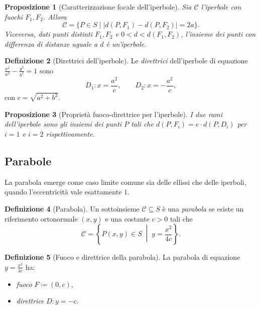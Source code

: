 \documentclass[11pt, a4paper]{book}
\theoremstyle{definition}
\newtheorem{definizione}{Definizione}[section]
\theoremstyle{plain}
\newtheorem{proposizione}[definizione]{Proposizione}
\theoremstyle{remark}
\begin{document}
\begin{proposizione}[Caratterizzazione focale dell'iperbole]
\label{prop:foc-iper}
Sia $\mathcal{C}$ l'iperbole con fuochi $F_1, F_2$. Allora
\[
  \mathcal{C} = \bigl\{ P \in S \;\big|\; |d(P,F_1) - d(P,F_2)| = 2a \bigr\}.
\]
Viceversa, dati punti distinti $F_1, F_2$ e $0 < d < d(F_1,F_2)$, l'insieme dei punti con differenza di distanze uguale a $d$ è un'iperbole.
\end{proposizione}

\begin{defbox}
\begin{definizione}[Direttrici dell'iperbole]
\label{def:direttrici-iper}
Le \emph{direttrici} dell'iperbole di equazione $\frac{x^2}{a^2}-\frac{y^2}{b^2}=1$ sono
\[
  D_1 \colon x = \frac{a^2}{c}, \qquad D_2 \colon x = -\frac{a^2}{c},
\]
con $c = \sqrt{a^2+b^2}$.
\end{definizione}
\end{defbox}

\begin{proposizione}[Proprietà fuoco-direttrice per l'iperbole]
\label{prop:foc-dir-iper}
I due rami dell'iperbole sono gli insiemi dei punti $P$ tali che $d(P, F_i) = e \cdot d(P, D_i)$ per $i=1$ e $i=2$ rispettivamente.
\end{proposizione}

\subsection{Parabole}

La parabola emerge come caso limite comune sia delle ellissi che delle iperboli, quando l'eccentricità vale esattamente $1$.

\begin{defbox}
\begin{definizione}[Parabola]
\label{def:parabola}
Un sottoinsieme $\mathcal{C} \subseteq S$ è una \emph{parabola} se esiste un riferimento ortonormale $(x,y)$ e una costante $c > 0$ tali che
\[
  \mathcal{C} = \left\{ P(x,y) \in S \;\middle|\; y = \frac{x^2}{4c} \right\}.
\]
\end{definizione}
\end{defbox}

\begin{defbox}
\begin{definizione}[Fuoco e direttrice della parabola]
\label{def:fuoco-par}
La parabola di equazione $y = \frac{x^2}{4c}$ ha:
\begin{itemize}
  \item \emph{fuoco} $F \coloneqq (0, c)$,
  \item \emph{direttrice} $D \colon y = -c$.
\end{itemize}
\end{definizione}
\end{defbox}
\end{document}
